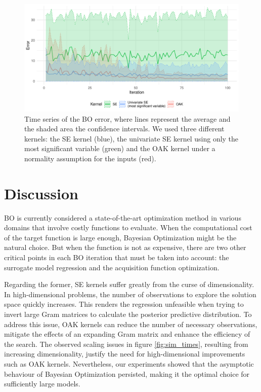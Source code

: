 \documentclass{IOS-Book-Article}
\begin{document}
	\begin{figure}[h!]
		\centering	
		\includegraphics[width=\textwidth]{figs/results.pdf}		
		\caption{Time series of the BO error, where lines represent the average and the shaded area the confidence intervals. We used three different kernels: the SE kernel (blue), the univariate SE kernel using only the most significant variable (green) and the OAK kernel under a normality assumption for the inputs (red).}
		\label{fig:results_oak}	
	\end{figure}
	
	\section{Discussion}
	BO is currently considered a state-of-the-art optimization method in various domains that involve costly functions to evaluate. When the computational cost of the target function is large enough, Bayesian Optimization might be the natural choice. But when the function is not as expensive, there are two other critical points in each BO iteration that must be taken into account: the surrogate model regression and the acquisition function optimization.
	
	Regarding the former, SE kernels suffer greatly from the curse of dimensionality. In high-dimensional problems, the number of observations to explore the solution space quickly increases. This renders the regression unfeasible when trying to invert large Gram matrices to calculate the posterior predictive distribution. To address this issue, OAK kernels can reduce the number of necessary observations, mitigate the effects of an expanding Gram matrix and enhance the efficiency of the search. The observed scaling issues in figure \ref{fig:sim_times}, resulting from increasing dimensionality, justify the need for high-dimensional improvements such as OAK kernels. Nevertheless, our experiments showed that the asymptotic behaviour of Bayesian Optimization persisted, making it the optimal choice for sufficiently large models.
	
\end{document}
